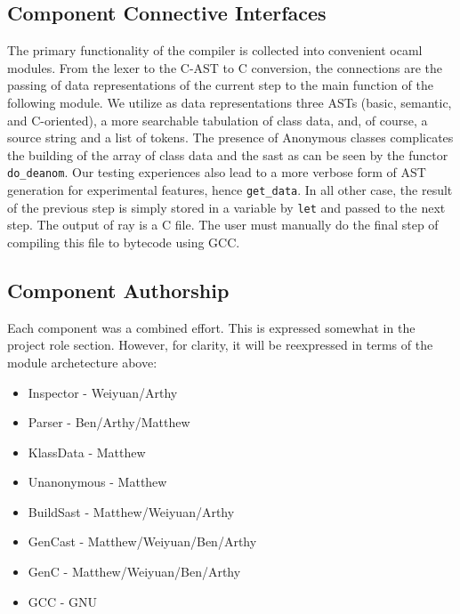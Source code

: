 \subsection{Component Connective Interfaces}


The primary functionality of the compiler is collected into convenient ocaml modules. From the lexer to the C-AST to C conversion, the connections are the passing of data representations of the current step to the main function of the following module. We utilize as data representations three ASTs (basic, semantic, and C-oriented), a more searchable tabulation of class data, and, of course, a source string and a list of tokens. The presence of Anonymous classes complicates the building of the array of class data and the sast as can be seen by the functor \verb!do_deanom!. Our testing experiences also lead to a more verbose form of AST generation for experimental features, hence \verb!get_data!. In all other case, the result of the previous step is simply stored in a variable by \verb!let! and passed to the next step. The output of ray is a C file. The user must manually do the final step of compiling this file to bytecode using GCC.

\subsection{Component Authorship}
Each component was a combined effort. This is expressed somewhat in the project role section. However, for clarity, it will be reexpressed in terms of the module archetecture above:

\begin{itemize}
\item Inspector - Weiyuan/Arthy
\item Parser - Ben/Arthy/Matthew
\item KlassData - Matthew
\item Unanonymous - Matthew
\item BuildSast - Matthew/Weiyuan/Arthy
\item GenCast - Matthew/Weiyuan/Ben/Arthy
\item GenC - Matthew/Weiyuan/Ben/Arthy
\item GCC - GNU
\end{itemize}